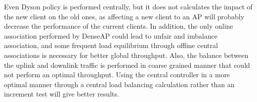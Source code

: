 \documentclass[journal,transmag]{IEEEtran}
\begin{document}
Even Dyson policy is performed centrally, but it does not calculates the impact of the new client on the old ones, as affecting a new client to an AP will probably decrease the performance of the current clients. In addition, the only online association performed by DenseAP could lead to unfair and imbalance association, and some frequent load equilibrium through offline central associations is necessary for better global throughput. Also, the balance between the uplink and downlink traffic is performed in coarse grained manner that could not perform an optimal throughput. Using the central controller in a more optimal manner through a central load balancing calculation rather than an increment test will give better results. \\


\end{document}
